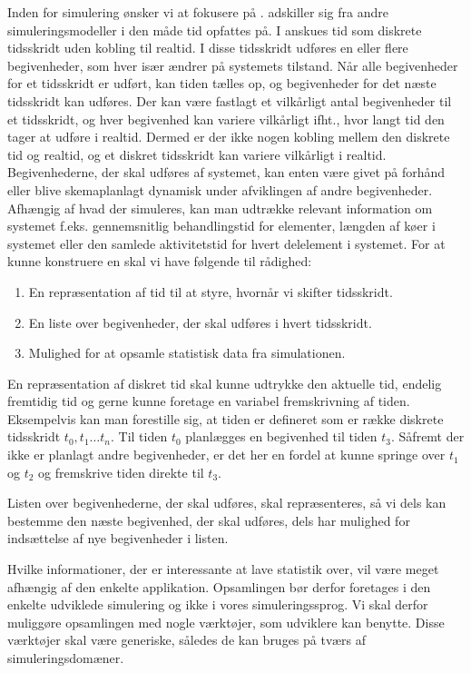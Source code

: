 Inden for simulering ønsker vi at fokusere på \des. \des adskiller sig fra andre simuleringsmodeller i den måde tid opfattes på. I \des anskues tid som diskrete tidsskridt uden kobling til realtid. I disse tidsskridt udføres en eller flere begivenheder, som hver især ændrer på systemets tilstand. Når alle begivenheder for et tidsskridt er udført, kan tiden tælles op, og begivenheder for det næste tidsskridt kan udføres. Der kan være fastlagt et vilkårligt antal begivenheder til et tidsskridt, og hver begivenhed kan variere vilkårligt ifht., hvor langt tid den tager at udføre i realtid. Dermed er der ikke nogen kobling mellem den diskrete tid og realtid, og et diskret tidsskridt kan variere vilkårligt i realtid. Begivenhederne, der skal udføres af systemet, kan enten være givet på forhånd eller blive skemaplanlagt dynamisk under afviklingen af andre begivenheder. 
Afhængig af hvad der simuleres, kan man udtrække relevant information om systemet f.eks. gennemsnitlig behandlingstid for elementer, længden af køer i systemet eller den samlede aktivitetstid for hvert delelement i systemet.
For at kunne konstruere en \des skal vi have følgende til rådighed:
\begin{enumerate}
\tightlist 
\item En repræsentation af tid til at styre, hvornår vi skifter tidsskridt.
\item En liste over begivenheder, der skal udføres i hvert tidsskridt.
\item Mulighed for at opsamle statistisk data fra simulationen. 
\end{enumerate}
En repræsentation af diskret tid skal kunne udtrykke den aktuelle tid, endelig fremtidig tid og gerne kunne foretage en variabel fremskrivning af tiden. Eksempelvis kan man forestille sig, at tiden er defineret som er række diskrete tidsskridt $t_0, t_1 \ldots t_n$. Til tiden $t_{0}$ planlægges en begivenhed til tiden $t_{3}$. Såfremt der ikke er planlagt andre begivenheder, er det her en fordel at kunne springe over $t_{1}$ og $t_{2}$ og fremskrive tiden direkte til $t_{3}$.

Listen over begivenhederne, der skal udføres, skal repræsenteres, så vi dels kan bestemme den næste begivenhed, der skal udføres, dels har mulighed for indsættelse af nye begivenheder i listen.

Hvilke informationer, der er interessante at lave statistik over, vil være meget afhængig af den enkelte applikation. Opsamlingen bør derfor foretages i den enkelte udviklede simulering og ikke i vores simuleringssprog. Vi skal derfor muliggøre opsamlingen med nogle værktøjer, som udviklere kan benytte. Disse værktøjer skal være generiske, således de kan bruges på tværs af simuleringsdomæner. 


